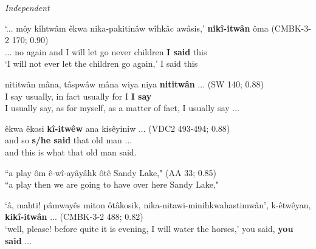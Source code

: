 \textit{Independent}

    \begin{exe}
    \ex
    \gll `... môy kîhtwâm êkwa nika-pakitinâw wîhkâc awâsis,’ \textbf{nikî-itwân} ôma \tiny{(CMBK-3-2 170; 0.90)}\\
     ... no again and {I will let go} never children  {\textbf{I said}} this \\
    \trans  `I will not ever let the children go again,' I said this \tiny{\citep[44]{AhenakewAlice2000}} 
    \label{ai-ive2}
    \end{exe}
    
    \begin{exe}
    \ex
    \gll nititwân mâna, tâspwâw mâna wiya niya \textbf{nititwân} ... \tiny{(SW 140; 0.88)} \\
         {I say} {usually}, {in fact} {usually} for I {\textbf{I say}} \\
    \trans  I usually say, as for myself, as a matter of fact, I usually say ... \tiny{\citep[76]{Whitecalf1993}}
    \label{ai-ive1}
    \end{exe}
    
    \begin{exe}
    \ex
    \gll êkwa êkosi \textbf{kî-itwêw} ana kisêyiniw ... \tiny{(VDC2 493-494; 0.88)}\\
         and  so {\textbf{s/he said}} that {old man} ... \\
    \trans  and this is what that old man said. \tiny{\citep[106-107]{VandallDouquette1987}}
    \label{ai-ive5}
    \end{exe}
    
        \begin{exe}
    \ex
    \gll ``a play ôm { } ê-wî-ayâyâhk {   } ôtê { } Sandy Lake," \tiny{(AA 33; 0.85)}\\
    ``a play then { } {we are going to have} {   } {over here} { } Sandy Lake,"\\
    \label{ai-ive4}
    \end{exe}
    
    
    \begin{exe}
    \ex
    \gll `â, mahti!  pâmwayês miton ôtâkosik, nika-nitawi-minihkwahastimwân’, k-êtwêyan, \textbf{kikî-itwân}  ... \tiny{(CMBK-3-2 488; 0.82)}\\
         `well, please! before quite {it is evening}, {I will water the horses},' {you said},  \textbf{you said} ... \\
    \trans  
    \label{ai-ive3}
    \end{exe}

